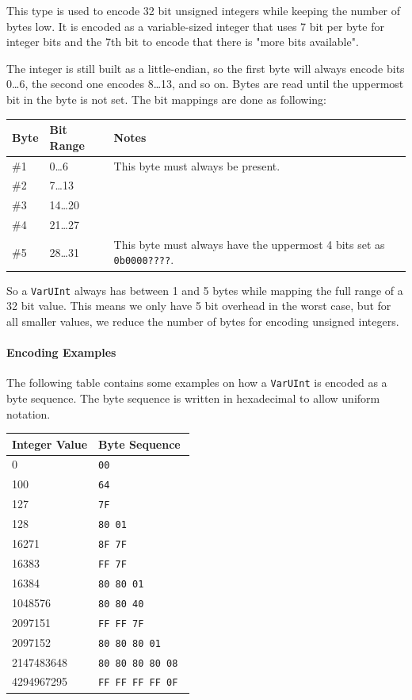 \documentclass[]{article}
\begin{document}
This type is used to encode 32 bit unsigned integers while keeping the
number of bytes low. It is encoded as a variable-sized integer that uses
7 bit per byte for integer bits and the 7th bit to encode that there is
"more bits available".

The integer is still built as a little-endian, so the first byte will
always encode bits 0\ldots6, the second one encodes 8\ldots13, and so
on. Bytes are read until the uppermost bit in the byte is not set. The bit
mappings are done as following:

\begin{longtable}[]{@{}p{0.5in}p{0.75in}p{4.75in}@{}}
\toprule
Byte & Bit Range & Notes \\
\midrule
\endhead
\#1 & 0\ldots6 & This byte must always be present. \\
\#2 & 7\ldots13 & \\
\#3 & 14\ldots20 & \\
\#4 & 21\ldots27 & \\
\#5 & 28\ldots31 & This byte must always have the uppermost 4 bits set as \texttt{0b0000????}. \\
\bottomrule
\end{longtable}

So a \texttt{VarUInt} always has between 1 and 5 bytes while mapping the
full range of a 32 bit value. This means we only have 5 bit overhead in
the worst case, but for all smaller values, we reduce the number of
bytes for encoding unsigned integers.

\paragraph{Encoding Examples}

The following table contains some examples on how a \texttt{VarUInt} is encoded as a byte sequence. The byte sequence is written in hexadecimal to allow uniform notation.

\begin{longtable}[]{@{}p{1in}p{5in}@{}}
\toprule
Integer Value & Byte Sequence \\
\midrule
\endhead
         0 & \texttt{00} \\
       100 & \texttt{64} \\
       127 & \texttt{7F} \\
       128 & \texttt{80 01} \\
     16271 & \texttt{8F 7F} \\
     16383 & \texttt{FF 7F} \\
     16384 & \texttt{80 80 01} \\
   1048576 & \texttt{80 80 40} \\
   2097151 & \texttt{FF FF 7F} \\
   2097152 & \texttt{80 80 80 01} \\
2147483648 & \texttt{80 80 80 80 08} \\
4294967295 & \texttt{FF FF FF FF 0F } \\
\bottomrule
\end{longtable}
\end{document}
